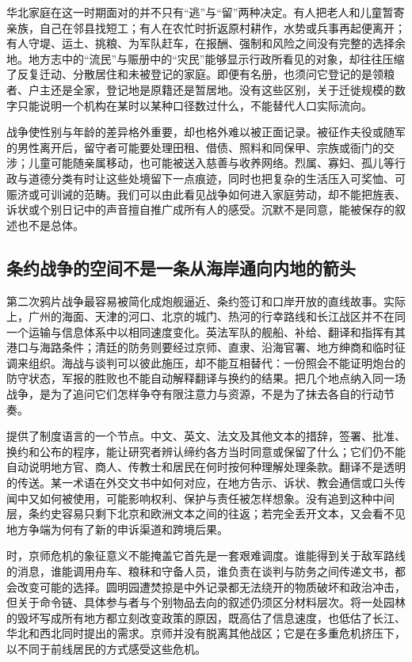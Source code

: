 华北家庭在这一时期面对的并不只有“逃”与“留”两种决定。有人把老人和儿童暂寄亲族，自己在邻县找短工；有人在农忙时折返原村耕作，水势或兵事再起便离开；有人守堤、运土、挑粮、为军队赶车，在报酬、强制和风险之间没有完整的选择余地。地方志中的“流民”与赈册中的“灾民”能够显示行政所看见的对象，却往往压缩了反复迁动、分散居住和未被登记的家庭。即便有名册，也须问它登记的是领粮者、户主还是全家，登记地是原籍还是暂居地。没有这些区别，关于迁徙规模的数字只能说明一个机构在某时以某种口径数过什么，不能替代人口实际流向。

战争使性别与年龄的差异格外重要，却也格外难以被正面记录。被征作夫役或随军的男性离开后，留守者可能要处理田租、借债、照料和同保甲、宗族或衙门的交涉；儿童可能随亲属移动，也可能被送入慈善与收养网络。烈属、寡妇、孤儿等行政与道德分类有时让这些处境留下一点痕迹，同时也把复杂的生活压入可奖恤、可赈济或可训诫的范畴。我们可以由此看见战争如何进入家庭劳动，却不能把旌表、诉状或个别日记中的声音擅自推广成所有人的感受。沉默不是同意，能被保存的叙述也不是总体。

\subsection{条约战争的空间不是一条从海岸通向内地的箭头}

第二次鸦片战争最容易被简化成炮舰逼近、条约签订和口岸开放的直线故事。实际上，广州的海面、天津的河口、北京的城门、热河的行幸路线和长江战区并不在同一个运输与信息体系中以相同速度变化。英法军队的舰船、补给、翻译和指挥有其港口与海路条件；清廷的防务则要经过京师、直隶、沿海官署、地方绅商和临时征调来组织。海战与谈判可以彼此施压，却不能互相替代：一份照会不能证明炮台的防守状态，军报的胜败也不能自动解释翻译与换约的结果。把几个地点纳入同一场战争，是为了追问它们怎样争夺有限注意力与资源，不是为了抹去各自的行动节奏。

提供了制度语言的一个节点。中文、英文、法文及其他文本的措辞，签署、批准、换约和公布的程序，能让研究者辨认缔约各方当时同意或保留了什么；它们仍不能自动说明地方官、商人、传教士和居民在何时按何种理解处理条款。翻译不是透明的传送。某一术语在外交文书中如何对应，在地方告示、诉状、教会通信或口头传闻中又如何被使用，可能影响权利、保护与责任被怎样想象。没有追到这种中间层，条约史容易只剩下北京和欧洲文本之间的往返；若完全丢开文本，又会看不见地方争端为何有了新的申诉渠道和跨境后果。

时，京师危机的象征意义不能掩盖它首先是一套艰难调度。谁能得到关于敌军路线的消息，谁能调用舟车、粮秣和守备人员，谁负责在谈判与防务之间传递文书，都会改变可能的选择。圆明园遭焚掠是中外记录都无法绕开的物质破坏和政治冲击，但关于命令链、具体参与者与个别物品去向的叙述仍须区分材料层次。将一处园林的毁坏写成所有地方都立刻改变政策的原因，既高估了信息速度，也低估了长江、华北和西北同时提出的需求。京师并没有脱离其他战区；它是在多重危机挤压下，以不同于前线居民的方式感受这些危机。

